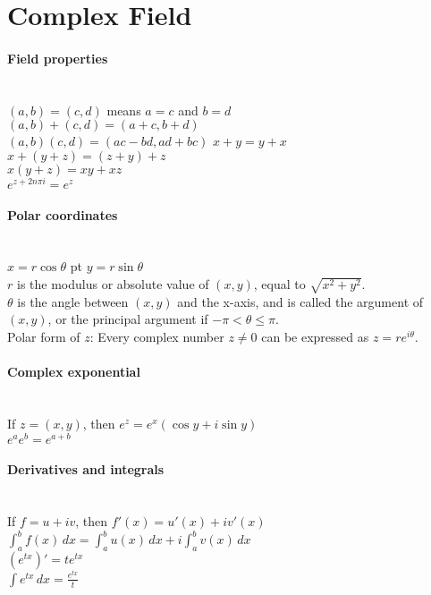 \documentclass[10pt]{article}
\begin{document}
\bigskip\bigskip
\section{Complex Field}\smallskip

\paragraph{Field properties}\ \\
$(a,b)=(c,d)$ means $a=c$ and $b=d$\\
$(a,b)+(c,d)=(a+c,b+d)$\\
$(a,b)(c,d)=(ac-bd,ad+bc)$
$x+y=y+x$\\
$x+(y+z)=(z+y)+z$\\
$x(y+z)=xy+xz$\\
$e^{z+2n\pi i}=e^z$

\begin{addmargin}[3em]{2em}%

{\indent \paragraph{Polar coordinates}\ \\
$x = r \cos \theta$  pt $y = r \sin \theta$\\
$r$ is the modulus or absolute value of $(x,y)$, equal to $\sqrt{x^2+y^2}$.\\
$\theta$ is the angle between $(x,y)$ and the x-axis, and is called the argument of $(x,y)$,
or the principal argument if $-\pi < \theta \leq \pi$.\\
Polar form of $z$: Every complex number $z \neq 0$ can be expressed as $z=re^{i\theta}$.}

\end{addmargin}


\paragraph{Complex exponential}\ \\
If $z=(x,y)$, then $e^z = e^x(\cos y + i \sin y)$\\
$e^ae^b=e^{a+b}$

\paragraph{Derivatives and integrals}\ \\
If $f=u+iv$, then $f'(x)=u'(x)+iv'(x)$\\
$\int_a^bf(x)\,dx=\int_a^bu(x)\,dx+i\int_a^bv(x)\,dx$\\
$(e^{tx})'=te^{tx}$\\
$\int e^{tx}\,dx=\frac{e^{tx}}{t}$
\end{document}
